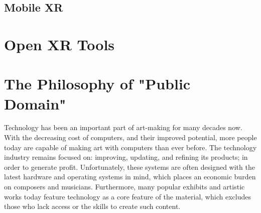 



\subsection{Mobile XR}

\section{Open XR Tools}

\section{The Philosophy of "Public Domain"}



Technology has been an important part of art-making for many decades now. With the decreasing cost of computers, and their improved potential, more people today are capable of making art with computers than ever before. The technology industry remains focused on: improving, updating, and refining its products; in order to generate profit. Unfortunately, these systems are often designed with the latest hardware and operating systems in mind, which places an economic burden on composers and musicians. Furthermore, many popular exhibits and artistic works today feature technology as a core feature of the material, which excludes those who lack access or the skills to create such content.

